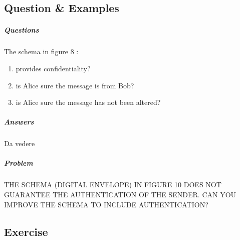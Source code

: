 \documentclass{article}
\begin{document}
                        \subsection{Question \& Examples}
                        \subparagraph{Questions}
                        The schema in figure 8 : 
                        \begin{enumerate}
                            \item provides confidentiality?
                            \item is Alice sure the message is from Bob?
                            \item is Alice sure the message has not been altered?
                        \end{enumerate}
                        \subparagraph{Answers} Da vedere
                        \subparagraph{Problem} THE SCHEMA (DIGITAL
                        ENVELOPE) IN FIGURE 10 DOES NOT GUARANTEE
                        THE AUTHENTICATION OF THE
                        SENDER.
                        CAN YOU IMPROVE THE SCHEMA
                        TO INCLUDE AUTHENTICATION?
                    \subsection{Exercise}
\end{document}
